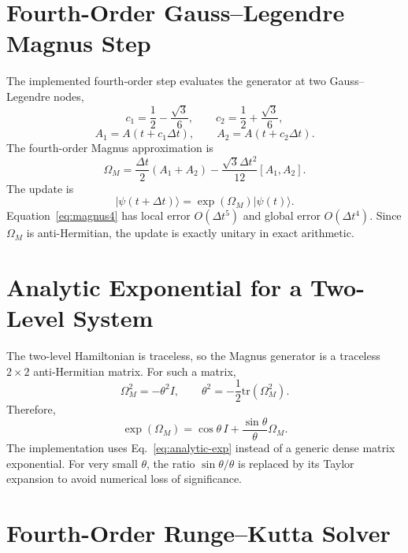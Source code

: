 \documentclass[11pt,a4paper]{article}
\begin{document}
\section{Fourth-Order Gauss--Legendre Magnus Step}

The implemented fourth-order step evaluates the generator at two Gauss--Legendre nodes,
\begin{equation}
c_1=\frac{1}{2}-\frac{\sqrt{3}}{6},\qquad
c_2=\frac{1}{2}+\frac{\sqrt{3}}{6},
\end{equation}
\begin{equation}
A_1=A(t+c_1\Delta t),\qquad
A_2=A(t+c_2\Delta t).
\end{equation}
The fourth-order Magnus approximation is
\begin{equation}
\Omega_M
=\frac{\Delta t}{2}(A_1+A_2)
 -\frac{\sqrt{3}\Delta t^2}{12}[A_1,A_2].
\label{eq:magnus4}
\end{equation}
The update is
\begin{equation}
|\psi(t+\Delta t)\rangle = \exp(\Omega_M)|\psi(t)\rangle.
\end{equation}
Equation~\eqref{eq:magnus4} has local error \(O(\Delta t^5)\) and global error \(O(\Delta t^4)\). Since \(\Omega_M\) is anti-Hermitian, the update is exactly unitary in exact arithmetic.

\section{Analytic Exponential for a Two-Level System}

The two-level Hamiltonian is traceless, so the Magnus generator is a traceless \(2\times2\) anti-Hermitian matrix. For such a matrix,
\begin{equation}
\Omega_M^2=-\theta^2 I,
\qquad
\theta^2=-\frac{1}{2}\mathrm{tr}(\Omega_M^2).
\end{equation}
Therefore,
\begin{equation}
\exp(\Omega_M)=
\cos\theta\,I+\frac{\sin\theta}{\theta}\Omega_M.
\label{eq:analytic-exp}
\end{equation}
The implementation uses Eq.~\eqref{eq:analytic-exp} instead of a generic dense matrix exponential. For very small \(\theta\), the ratio \(\sin\theta/\theta\) is replaced by its Taylor expansion to avoid numerical loss of significance.

\section{Fourth-Order Runge--Kutta Solver}
\end{document}
